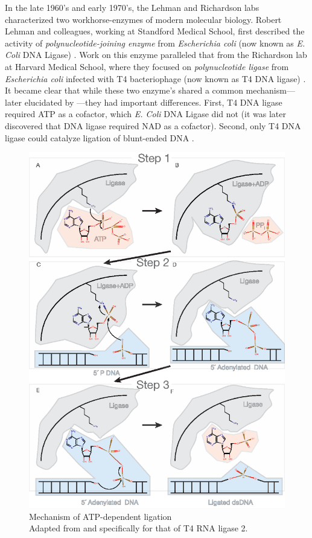     In the late 1960's and early 1970's, the Lehman and Richardson labs characterized two workhorse-enzymes of modern molecular biology. Robert Lehman and colleagues, working at Standford Medical School, first described the activity of \textit{polynucleotide-joining enzyme} from \textit{Escherichia coli} (now known as \textit{E. Coli} DNA Ligase) \citep{Olivera1967b}. Work on this enzyme paralleled that from the Richardson lab at Harvard Medical School, where they focused on \textit{polynucleotide ligase} from \textit{Escherichia coli} infected with T4 bacteriophage (now known as T4 DNA ligase) \citep{Weiss1967a}. It became clear that while these two enzyme's shared a common mechanism---later elucidated by \citep{Modrich1973a}---they had important differences. First, T4 DNA ligase required ATP as a cofactor, which \textit{E. Coli} DNA Ligase did not (it was later discovered that DNA ligase required NAD as a cofactor). Second, only T4 DNA ligase could catalyze ligation of blunt-ended DNA \citep{Tabor1987a}.

    \begin{figure}%
      \centering 
      \includegraphics{Figures/Intro/LigationMechanism.eps}
      \caption[Mechanism of Rnl2 ATP-dependent ligation]
      {
        Mechanism of ATP-dependent ligation\\[0.25cm]
        Adapted from \citep{Nandakumar2006} and specifically for that of T4 RNA ligase 2.
        }
      \label{Intro:fig:Ligation Mechanism}
      \end{figure}

